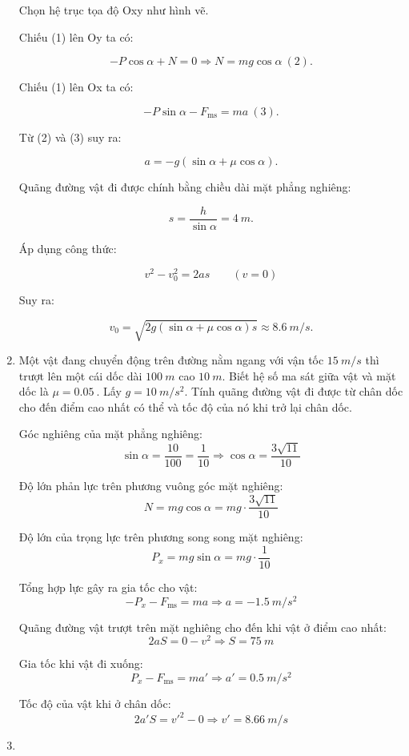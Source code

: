 \begin{enumerate}[label=\bfseries Bài \arabic*:,leftmargin=1.5cm]
{	Chọn hệ trục tọa độ Oxy như hình vẽ.
	
	Chiếu (1) lên Oy ta có:
	
	$$ - P \cos \alpha + N =0 \Rightarrow N = mg \cos \alpha\ (2).$$
	
	Chiếu (1) lên Ox ta có: 
	
	$$ - P \sin \alpha - F_\text{ms} = ma\ (3).$$
	
	Từ (2) và (3) suy ra:
	
	$$a = -g(\sin \alpha + \mu \cos \alpha).$$
	
	Quãng đường vật đi được chính bằng chiều dài mặt phẳng nghiêng:
	
	$$s = \dfrac{h}{\sin \alpha } = \SI{4}{m}.$$
	
	Áp dụng công thức:
	
	$$v^2 - v_0^2 = 2as\qquad (v=0)$$ 
	
	Suy ra:
	
	$$v_0 = \sqrt{2g(\sin \alpha + \mu \cos \alpha)s} \approx \SI{8,6}{m/s}.$$
}

	
\item {}


{Một vật đang chuyển động trên đường nằm ngang với vận tốc $\SI{15}{m/s}$ thì trượt lên một cái dốc dài $\SI{100}{m}$ cao $\SI{10}{m}$. Biết hệ số ma sát giữa vật và mặt dốc là $\mu = \SI{0.05}{}$. Lấy $g=\SI{10}{m/s^2}$. Tính quãng đường vật đi được từ chân dốc cho đến điểm cao nhất có thể và tốc độ của nó khi trở lại chân dốc.
}

\hideall
{Góc nghiêng của mặt phẳng nghiêng:
	$$\sin \alpha = \dfrac{10}{100} = \dfrac{1}{10} \Rightarrow \cos \alpha = \dfrac{3\sqrt{11}}{10}$$
	
	Độ lớn phản lực trên phương vuông góc mặt nghiêng:
	$$N=mg \cos \alpha = mg \cdot \dfrac{3\sqrt{11}}{10}$$
	
	Độ lớn của trọng lực trên phương song song mặt nghiêng:
	$$P_x = mg \sin \alpha = mg \cdot \dfrac{1}{10}$$
	
	Tổng hợp lực gây ra gia tốc cho vật:
	$$-P_x - F_\text{ms} = ma \Rightarrow a =\SI{-1.5}{m/s^2} $$
	
	Quãng đường vật trượt trên mặt nghiêng cho đến khi vật ở điểm cao nhất:
	$$2aS = 0 -v^2 \Rightarrow S = \SI{75}{m}$$
	
	Gia tốc khi vật đi xuống:
	$$P_x - F_\text{ms} = ma' \Rightarrow a' = \SI{0.5}{m/s^2}$$
	
	Tốc độ của vật khi ở chân dốc:
	$$2a' S = v'^2 - 0 \Rightarrow v' = \SI{8.66}{m/s}$$
}

\item {}



\end{enumerate}
